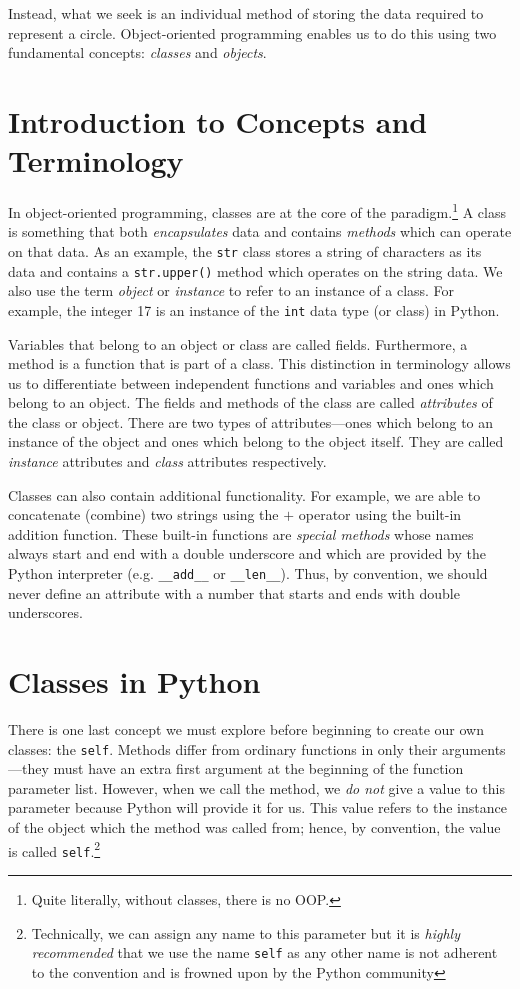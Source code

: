 \documentclass{cslesson}
\begin{document}
Instead, what we seek is an individual method of storing the data required to represent a circle. 
Object-oriented programming enables us to do this using two fundamental concepts: 
\textit{classes} and \textit{objects}.

\section{Introduction to Concepts and Terminology}

In object-oriented programming, classes are at the core of the paradigm.\footnote{Quite literally, without classes, there is no OOP.} 
A class is something that both \textit{encapsulates} data and contains \textit{methods} which can operate on that data. 
As an example, the \texttt{str} class stores a string of characters as its data and contains a \texttt{str.upper()} method which operates 
on the string data. We also use the term \textit{object} or \textit{instance} to refer to an instance of a class. 
For example, the integer 17 is an instance of the \texttt{int} data type (or class) in Python.

Variables that belong to an object or class are called fields. Furthermore, a method is a function that is part of a class. 
This distinction in terminology allows us to differentiate between independent functions and variables and ones which belong to an object. 
The fields and methods of the class are called \textit{attributes} of the class or object. There are two types of attributes---ones 
which belong to an instance of the object and ones which belong to the object itself. They are called \textit{instance} attributes and \textit{class} 
attributes respectively.

Classes can also contain additional functionality. For example, we are able to concatenate (combine) two strings using the \texttt{$+$} operator
using the built-in addition function. These built-in functions are \textit{special methods} whose names always start and end with a double underscore
and which are provided by the Python interpreter (e.g. \texttt{\_\_add\_\_} or \texttt{\_\_len\_\_}). Thus, by convention, we should never define
an attribute with a number that starts and ends with double underscores.

\section{Classes in Python}

There is one last concept we must explore before beginning to create our own classes: the \texttt{self}. Methods differ from ordinary functions
in only their arguments---they must have an extra first argument at the beginning of the function parameter list. However, when we
call the method, we \textit{do not} give a value to this parameter because Python will provide it for us. This value refers to the instance of the 
object which the method was called from; hence, by convention, the value is called \texttt{self}.\footnote{Technically, we can assign any name to this
parameter but it is \textit{highly recommended} that we use the name \texttt{self} as any other name is not adherent to the convention and is frowned upon
by the Python community}
\end{document}

